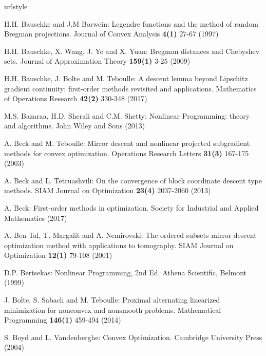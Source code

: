 \documentclass{svjour3}                %
\begin{document}
\begin{thebibliography}{10}
	\providecommand{\url}[1]{{#1}}
	\providecommand{\urlprefix}{URL }
	\expandafter\ifx\csname urlstyle\endcsname\relax
	\providecommand{\doi}[1]{DOI~\discretionary{}{}{}#1}\else
	\providecommand{\doi}{DOI~\discretionary{}{}{}\begingroup
		\urlstyle{rm}\Url}\fi
	
	H.H. Bauschke and J.M Borwein: Legendre functions and the method of random Bregman projections.
	\newblock Journal of Convex Analysis \textbf{4(1)} 27-67 (1997)
	
	H.H. Bauschke, X. Wang, J. Ye and X. Yuan: Bregman distances and Chebyshev sets.
	\newblock Journal of Approximation Theory
	\textbf{159(1)} 3-25 (2009)
	
	H.H. Bauschke, J. Bolte and M. Teboulle: A descent lemma beyond Lipschitz gradient continuity: first-order methods revisited and applications. 
	\newblock Mathematics of Operations Research
	\textbf{42(2)} 330-348 (2017)
	
	M.S. Bazaraa, H.D. Sherali and C.M. Shetty: Nonlinear Programming: theory and algorithms.
	\newblock John Wiley and Sons (2013)
	
	A. Beck and M. Teboulle:
	Mirror descent and nonlinear projected subgradient methods for convex optimization.
	\newblock Operations Research Letters \textbf{31(3)} 167-175 (2003)
	
	A. Beck and L. Tetruashvili: On the convergence of block coordinate descent type methods. 
	\newblock SIAM Journal on Optimization
	\textbf{23(4)} 2037-2060 (2013)
	
	A. Beck: First-order methods in optimization.
	\newblock Society for Industrial and Applied Mathematics (2017)
	
	A. Ben-Tal, T. Margalit and A. Nemirovski: The ordered subsets mirror descent optimization method with applications to tomography.
	\newblock SIAM Journal on Optimization 
	\textbf{12(1)} 79-108 (2001)
	
	D.P. Bertsekas: Nonlinear Programming, 2nd Ed.
	\newblock Athena Scientific, Belmont (1999)
	
	J. Bolte, S. Sabach and M. Teboulle: Proximal alternating linearized minimization for nonconvex and nonsmooth problems. 
	\newblock Mathematical Programming 
	\textbf{146(1)} 459-494 (2014)
	
	S. Boyd and L. Vandenberghe: Convex Optimization.
	\newblock Cambridge University Press (2004)
	

\end{thebibliography}
\end{document}
